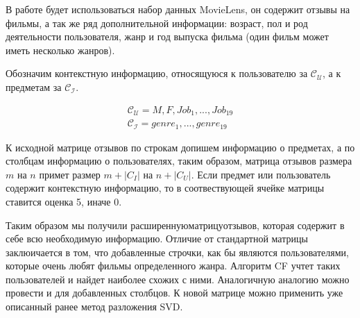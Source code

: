 В работе будет использоваться набор данных MovieLens, он содержит отзывы на фильмы, а так же ряд дополнительной информации: возраст, пол и род деятельности пользователя, жанр и год выпуска фильма (один фильм может иметь несколько жанров).

Обозначим контекстную информацию, относящуюся к пользователю за $\mathcal{C_U}$, а к предметам за $\mathcal{C_I}$. 

\begin{gather*}
\mathcal{C_U} = {M, F, Job_1, ... , Job_{19}} \\
\mathcal{C_I} = {genre_1, ..., genre_{19}}
\end{gather*}


К исходной матрице отзывов по строкам допишем информацию о предметах, а по столбцам информацию о пользователях, таким образом, матрица отзывов размера $m$ на $n$ примет размер $m+|C_I|$ на $n+|C_U|$. Если предмет или пользователь содержит контекстную информацию, то в соотвествующей ячейке матрицы ставится оценка 5, иначе 0.


Таким образом мы получили $\mathit{расширенную матрицу отзывов}$, которая содержит в себе всю необходимую информацию. Отличие от стандартной матрицы заклюичается в том, что добавленные строчки, как бы являются пользователями, которые очень любят фильмы определенного жанра. Алгоритм CF учтет таких пользователей и найдет наиболее схожих с ними. Аналогичную аналогию можно провести и для добавленных столбцов. К новой матрице можно применить уже описанный ранее метод разложения SVD.